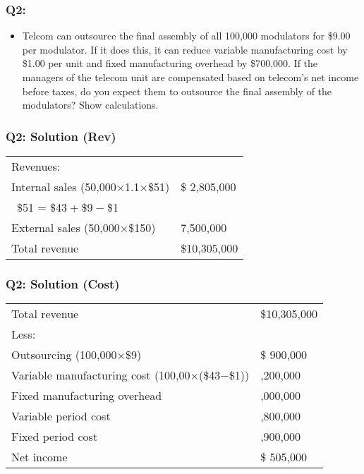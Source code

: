 \hypertarget{q2-1}{%
\subsubsection{Q2:}\label{q2-1}}

\begin{itemize}
\tightlist
\item
  Telcom can outsource the final assembly of all 100,000 modulators for
  \$9.00 per modulator. If it does this, it can reduce variable
  manufacturing cost by \$1.00 per unit and fixed manufacturing overhead
  by \$700,000. If the managers of the telecom unit are compensated
  based on telecom's net income before taxes, do you expect them to
  outsource the final assembly of the modulators? Show calculations.
\end{itemize}

\hypertarget{q2-solution-rev}{%
\subsubsection{Q2: Solution (Rev)}\label{q2-solution-rev}}

\begin{longtable}[]{@{}ll@{}}
\toprule\noalign{}
\endhead
\bottomrule\noalign{}
\endlastfoot
Revenues: & \\
Internal sales {(50,000×1.1×\$51)} & \$ 2,805,000 \\
{  \$51 = \$43 + \$9 − \$1} & \\
External sales {(50,000×\$150)} & 7,500,000 \\
Total revenue & \$10,305,000 \\
\end{longtable}

\hypertarget{q2-solution-cost}{%
\subsubsection{Q2: Solution (Cost)}\label{q2-solution-cost}}

\begin{longtable}[]{@{}
  >{\raggedright\arraybackslash}p{}
  >{\raggedright\arraybackslash}p{}@{}}
\toprule\noalign{}
\endhead
\bottomrule\noalign{}
\endlastfoot
Total revenue & \$10,305,000 \\
Less: & \\
Outsourcing {(100,000×\$9)} & \$ 900,000 \\
Variable manufacturing cost {(100,00×(\$43−\$1))} & 4,200,000 \\
Fixed manufacturing overhead & 1,000,000 \\
Variable period cost & 1,800,000 \\
Fixed period cost & 1,900,000 \\
Net income & \$ 505,000 \\
\end{longtable}

